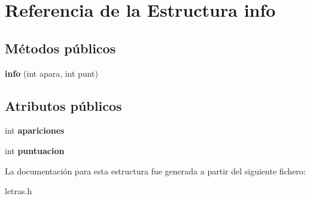 \section{Referencia de la Estructura info}
\label{structinfo}
\subsection*{Métodos públicos}
\begin{DoxyCompactItemize}
\item 
\mbox{\label{structinfo_afe7ef9d6316c0d999561eea884781bad}} 
{\bfseries info} (int apara, int punt)
\end{DoxyCompactItemize}
\subsection*{Atributos públicos}
\begin{DoxyCompactItemize}
\item 
\mbox{\label{structinfo_a634e8f3f06ee707f05b1a18c84d5ec26}} 
int {\bfseries apariciones}
\item 
\mbox{\label{structinfo_a6b374b9892dcf95f9c44cc7a203c5e57}} 
int {\bfseries puntuacion}
\end{DoxyCompactItemize}


La documentación para esta estructura fue generada a partir del siguiente fichero\+:\begin{DoxyCompactItemize}
\item 
letras.\+h\end{DoxyCompactItemize}
